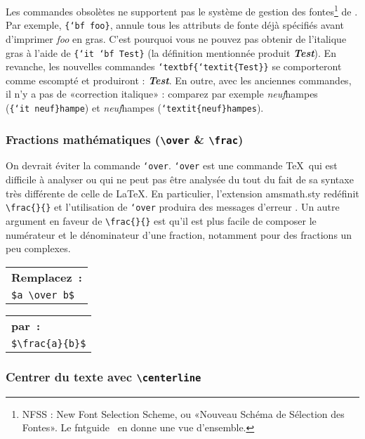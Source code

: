 \documentclass[fontsize=11pt, paper=a4, pagesize, captions=tableheading, numbers=enddot, toc=graduated, footnotes=multiple]{scrartcl}%
\makeatletter
\DeclareRobustCommand*{\Macro}[1]{\mbox{\texttt{\char`\\#1}}}
\DeclareRobustCommand*{\LMacro}[2]{\mbox{\texttt{\char`\\#1\{#2\}}}}
\DeclareRobustCommand*{\GMacro}[2]{\mbox{\texttt{\{\char`\\#1\ #2\}}}}
\newcommand{\Doku}[1]{\textsf{#1}\xspace}
\newcommand{\Paket}[1]{\textsf{#1.sty}\xspace}
\newenvironment{Ers}[1][\linewidth]{%
  \par\bigskip\noindent\marginline{\textcolor{gruen}{\boldmath $\triangleright$}}\begin{tabular}[t]{@{}p{0.5\textwidth}@{}}\textcolor{rot}{\textbf{\textsf{Remplacez~:}}%
}\\[2pt] \rahmenpr[#1]}%
{\endrahmenpr\end{tabular}}
\newenvironment{Dur}[1][0.5\textwidth]{%
\noindent\begin{tabular}[t]{@{}p{0.5\textwidth - 0.5em}@{}}\textcolor{gruen}{\textbf{\textsf{par~:}}}\\[2pt]\rahmenpg[#1]}%
{\endrahmenpg\end{tabular}\smallskip\noindent}
\makeatother
\begin{document}
Les commandes obsolètes ne supportent pas le système de gestion des fontes\footnote{NFSS : New Font Selection Scheme, ou «Nouveau Schéma de Sélection des Fontes». Le \Doku{fntguide}~\cite{fntguide-05} en donne une vue d’ensemble. } de \LaTeXe{}. Par exemple, \GMacro{bf}{foo}, annule tous les attributs de fonte déjà spécifiés avant d'imprimer \emph{foo} en gras. C'est pourquoi vous ne pouvez pas obtenir de l'italique gras à l'aide de \GMacro{it}{\Macro{bf Test}} (la définition mentionnée produit {\it\bf Test}). En revanche, les nouvelles commandes \LMacro{textbf}{\LMacro{textit}{Test}} se comporteront comme escompté et produiront : \textbf{\textit{Test}}. En outre, avec les anciennes commandes, il n'y a pas de «correction italique» : comparez par exemple {\it neuf}hampes (\GMacro{it}{neuf}\texttt{hampe}) et \textit{neuf}hampes (\LMacro{textit}{neuf}\texttt{hampes}).

\subsubsection{Fractions mathématiques (\texttt{\textbackslash over}
  \& \texttt{\textbackslash frac})}
\label{sec:textb-over-vs}

On devrait éviter la commande \Macro{over}. \Macro{over} est une commande \TeX\ qui est difficile à analyser ou qui ne peut pas être analysée du tout du fait de sa syntaxe très différente de celle de \LaTeX. En particulier, l'extension \Paket{amsmath} redéfinit \verb+\frac{}{}+ et l'utilisation de \Macro{over} produira des messages d'erreur . Un autre argument en faveur de \verb+\frac{}{}+ est qu'il est plus facile de composer le numérateur et le dénominateur d'une fraction, notamment pour des fractions un peu complexes.

\begin{Ers}
  \verb+$a \over b$+
\end{Ers}
\begin{Dur}
\verb+$\frac{a}{b}$+
\end{Dur}

\subsubsection{Centrer du texte avec \texttt{\textbackslash centerline}}
\label{sec:centerline}
\end{document}
